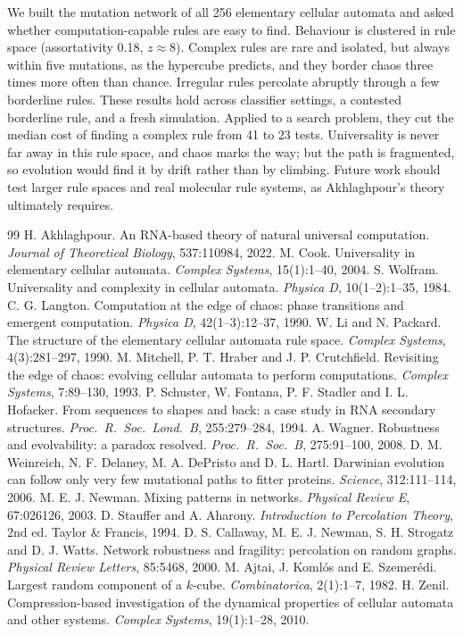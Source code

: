 \documentclass[10pt,letterpaper,twocolumn]{article}
\begin{document}
We built the mutation network of all 256 elementary cellular automata and asked whether computation-capable rules are easy to find. Behaviour is clustered in rule space (assortativity 0.18, $z \approx 8$). Complex rules are rare and isolated, but always within five mutations, as the hypercube predicts, and they border chaos three times more often than chance. Irregular rules percolate abruptly through a few borderline rules. These results hold across classifier settings, a contested borderline rule, and a fresh simulation. Applied to a search problem, they cut the median cost of finding a complex rule from 41 to 23 tests. Universality is never far away in this rule space, and chaos marks the way; but the path is fragmented, so evolution would find it by drift rather than by climbing. Future work should test larger rule spaces and real molecular rule systems, as Akhlaghpour's theory ultimately requires.

\small
\begin{thebibliography}{99}\setlength{\itemsep}{1pt}
 H. Akhlaghpour. An RNA-based theory of natural universal computation. \emph{Journal of Theoretical Biology}, 537:110984, 2022.
 M. Cook. Universality in elementary cellular automata. \emph{Complex Systems}, 15(1):1--40, 2004.
 S. Wolfram. Universality and complexity in cellular automata. \emph{Physica D}, 10(1--2):1--35, 1984.
 C. G. Langton. Computation at the edge of chaos: phase transitions and emergent computation. \emph{Physica D}, 42(1--3):12--37, 1990.
 W. Li and N. Packard. The structure of the elementary cellular automata rule space. \emph{Complex Systems}, 4(3):281--297, 1990.
 M. Mitchell, P. T. Hraber and J. P. Crutchfield. Revisiting the edge of chaos: evolving cellular automata to perform computations. \emph{Complex Systems}, 7:89--130, 1993.
 P. Schuster, W. Fontana, P. F. Stadler and I. L. Hofacker. From sequences to shapes and back: a case study in RNA secondary structures. \emph{Proc.\ R.\ Soc.\ Lond.\ B}, 255:279--284, 1994.
 A. Wagner. Robustness and evolvability: a paradox resolved. \emph{Proc.\ R.\ Soc.\ B}, 275:91--100, 2008.
 D. M. Weinreich, N. F. Delaney, M. A. DePristo and D. L. Hartl. Darwinian evolution can follow only very few mutational paths to fitter proteins. \emph{Science}, 312:111--114, 2006.
 M. E. J. Newman. Mixing patterns in networks. \emph{Physical Review E}, 67:026126, 2003.
 D. Stauffer and A. Aharony. \emph{Introduction to Percolation Theory}, 2nd ed. Taylor \& Francis, 1994.
 D. S. Callaway, M. E. J. Newman, S. H. Strogatz and D. J. Watts. Network robustness and fragility: percolation on random graphs. \emph{Physical Review Letters}, 85:5468, 2000.
 M. Ajtai, J. Koml\'os and E. Szemer\'edi. Largest random component of a $k$-cube. \emph{Combinatorica}, 2(1):1--7, 1982.
 H. Zenil. Compression-based investigation of the dynamical properties of cellular automata and other systems. \emph{Complex Systems}, 19(1):1--28, 2010.
\end{thebibliography}
\end{document}

